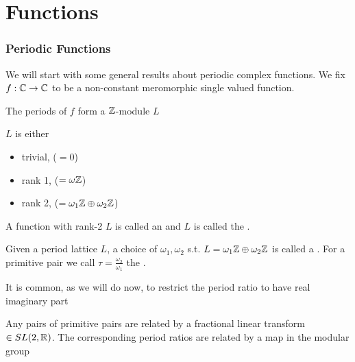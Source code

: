 \documentclass{article}
\begin{document}
\part{Functions}

\section{Periodic Functions}
We will start with some general results about periodic complex functions. We fix $f:\mathbb{C} \to \mathbb{C}$ to be a non-constant meromorphic single valued function. 

\begin{lemma}
	The periods of $f$ form a $\mathbb{Z}$-module $L$ 
\end{lemma}

\begin{prop}
	$L$ is either 
	\begin{itemize}
		\item trivial, ($=0$)
		\item rank 1, ($=\omega \mathbb{Z}$)
		\item rank 2, ($=\omega_1 \mathbb{Z} \oplus \omega_2 \mathbb{Z}$)
	\end{itemize}
\end{prop}

\begin{definition}
	A function with rank-2 $L$ is called an  and $L$ is called the . 
\end{definition}

\begin{definition}
	Given a period lattice $L$, a choice of $\omega_1, \omega_2$ s.t.  $L = \omega_1 \mathbb{Z} \oplus \omega_2 \mathbb{Z}$ is called a . For a primitive pair we call $\tau = \frac{\omega_2}{\omega_1}$ the . 
\end{definition}

It is common, as we will do now, to restrict the period ratio to have real imaginary part

\begin{prop}
	Any pairs of primitive pairs are related by a fractional linear transform $\in SL(2,\mathbb{R})$. The corresponding period ratios are related by a map in the modular group
\end{prop}
\end{document}
